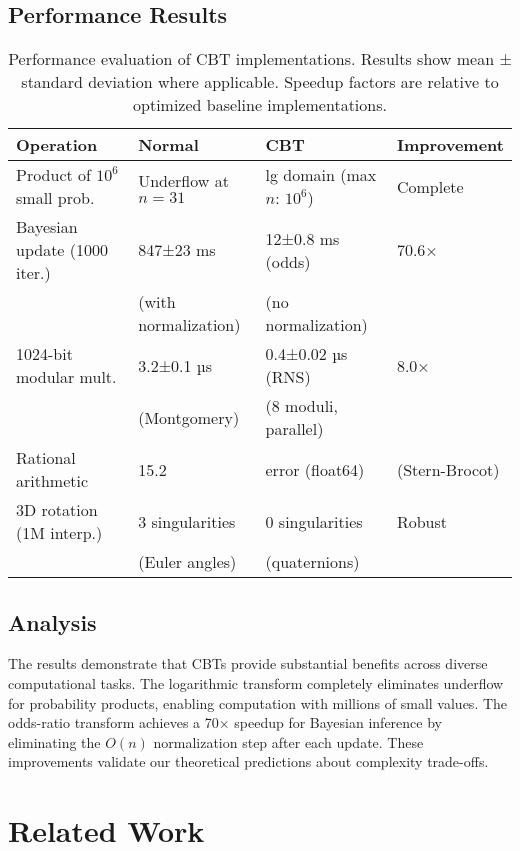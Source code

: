 \documentclass[12pt,a4paper]{article}
\theoremstyle{definition}
\begin{document}
\subsection{Performance Results}

\begin{table}[h]
\centering
\begin{tabular}{@{}llll@{}}
\toprule
Operation & Normal & CBT & Improvement \\
\midrule
Product of $10^6$ small prob. & Underflow at $n=31$ & lg domain (max $n$: $10^6$) & Complete \\
Bayesian update (1000 iter.) & 847±23 ms & 12±0.8 ms (odds) & 70.6× \\
& (with normalization) & (no normalization) & \\
1024-bit modular mult. & 3.2±0.1 µs & 0.4±0.02 µs (RNS) & 8.0× \\
& (Montgomery) & (8 moduli, parallel) & \\
Rational arithmetic & 15.2%
& error (float64) & (Stern-Brocot) & \\
3D rotation (1M interp.) & 3 singularities & 0 singularities & Robust \\
& (Euler angles) & (quaternions) & \\
\bottomrule
\end{tabular}
\caption{Performance evaluation of CBT implementations. Results show mean ± standard deviation where applicable. Speedup factors are relative to optimized baseline implementations.}
\label{tab:results}
\end{table}

\subsection{Analysis}

The results demonstrate that CBTs provide substantial benefits across diverse computational tasks. The logarithmic transform completely eliminates underflow for probability products, enabling computation with millions of small values. The odds-ratio transform achieves a 70× speedup for Bayesian inference by eliminating the $O(n)$ normalization step after each update. These improvements validate our theoretical predictions about complexity trade-offs.

\section{Related Work}
\end{document}

